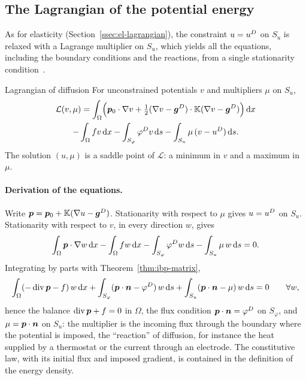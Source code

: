 \subsection{The Lagrangian of the potential energy}\label{ssec:diff-lagrangian}
%
As for elasticity (Section~\ref{ssec:el-lagrangian}), the constraint
$u=u^{D}$ on $S_u$ is relaxed with a Lagrange multiplier on $S_u$, which yields
all the equations, including the boundary conditions and the reactions, from
a single stationarity condition~\cite{BonnetFrangi2007}.

\begin{gbox}{Lagrangian of diffusion}
For unconstrained potentials $v$ and multipliers $\mu$ on $S_u$,
\begin{multline}\label{eq:L-diff}
  \mathcal L(v,\mu)=\int_\Omega\Bigl(\bm{p}_0\cdot\nabla v
  +\tfrac12(\nabla v-\bm{g}^D)\cdot\mathbb{K}(\nabla v-\bm{g}^D)\Bigr)\,\mathrm{d} x\\
  -\int_\Omega fv\,\mathrm{d} x-\int_{S_\varphi}\varphi^{D} v\,\mathrm{d} s
  -\int_{S_u}\mu\,(v-u^{D})\,\mathrm{d} s .
\end{multline}
The solution $(u,\mu)$ is a saddle point of $\mathcal L$: a minimum in $v$ and
a maximum in $\mu$.
\end{gbox}
\paragraph{Derivation of the equations.} Write
$\bm{p}=\bm{p}_0+\mathbb{K}(\nabla u-\bm{g}^D)$. Stationarity with respect to $\mu$ gives
$u=u^{D}$ on $S_u$. Stationarity with respect to $v$, in every direction $w$,
gives
\[
  \int_\Omega\bm{p}\cdot\nabla w\,\mathrm{d} x-\int_\Omega fw\,\mathrm{d} x
  -\int_{S_\varphi}\varphi^{D} w\,\mathrm{d} s-\int_{S_u}\mu\,w\,\mathrm{d} s=0 .
\]
Integrating by parts with Theorem~\ref{thm:ibp-matrix},
\[
  \int_\Omega(-\operatorname{div}\bm{p}-f)\,w\,\mathrm{d} x+\int_{S_\varphi}(\bm{p}\cdot\bm{n}-\varphi^{D})\,w\,\mathrm{d} s
  +\int_{S_u}(\bm{p}\cdot\bm{n}-\mu)\,w\,\mathrm{d} s=0\qquad\forall w,
\]
hence the balance $\operatorname{div}\bm{p}+f=0$ in $\Omega$, the flux condition
$\bm{p}\cdot\bm{n}=\varphi^{D}$ on $S_\varphi$, and $\mu=\bm{p}\cdot\bm{n}$ on $S_u$: the multiplier
is the incoming flux through the boundary where the potential is imposed, the
``reaction'' of diffusion, for instance the heat supplied by a thermostat or
the current through an electrode. The constitutive law, with its initial flux and imposed gradient,
is contained in the definition of the energy density.

